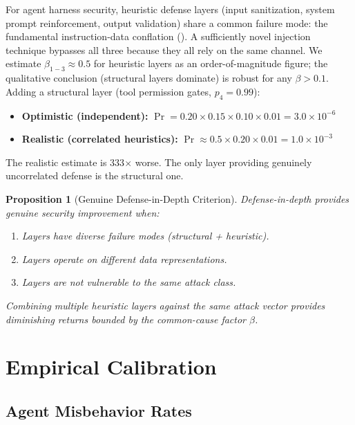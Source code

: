\documentclass[11pt, a4paper, copyright]{googledeepmind}
\newtheorem{proposition}{Proposition}[section]
\begin{document}
For agent harness security, heuristic defense layers (input sanitization, system prompt reinforcement, output validation) share a common failure mode: the fundamental instruction-data conflation (). A sufficiently novel injection technique bypasses all three because they all rely on the same channel. We estimate $\beta_{1-3} \approx 0.5$ for heuristic layers as an order-of-magnitude figure; the qualitative conclusion (structural layers dominate) is robust for any $\beta > 0.1$. Adding a structural layer (tool permission gates, $p_4 = 0.99$):

\begin{itemize}
    \item \textbf{Optimistic (independent):} $\Pr = 0.20 \times 0.15 \times 0.10 \times 0.01 = 3.0 \times 10^{-6}$
    \item \textbf{Realistic (correlated heuristics):} $\Pr \approx 0.5 \times 0.20 \times 0.01 = 1.0 \times 10^{-3}$
\end{itemize}

The realistic estimate is 333$\times$ worse. The only layer providing genuinely uncorrelated defense is the structural one.

\begin{proposition}[Genuine Defense-in-Depth Criterion]
\label{prop:genuine-did}
Defense-in-depth provides genuine security improvement when:
\begin{enumerate}
    \item Layers have diverse failure modes (structural + heuristic).
    \item Layers operate on different data representations.
    \item Layers are not vulnerable to the same attack class.
\end{enumerate}
Combining multiple heuristic layers against the same attack vector provides diminishing returns bounded by the common-cause factor $\beta$.
\end{proposition}


\section{Empirical Calibration}
\label{sec:empirical}

\subsection{Agent Misbehavior Rates}
\end{document}

